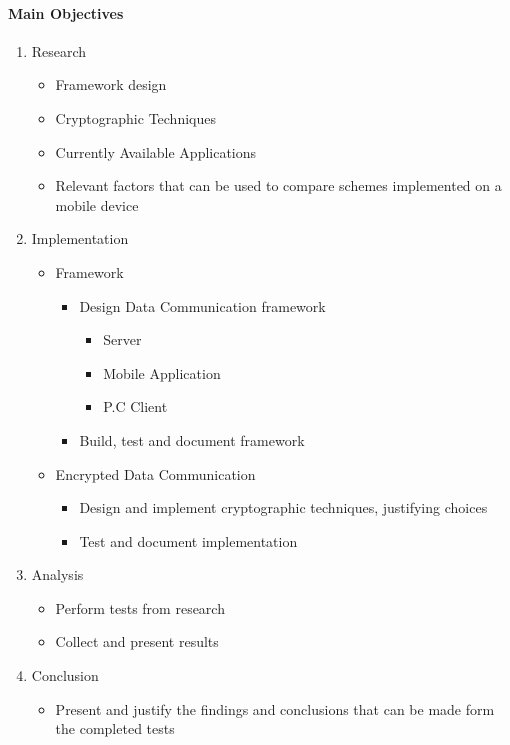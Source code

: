 \documentclass[a4paper,11pt]{article}
\begin{document}
\paragraph{Main Objectives}
\begin{enumerate}
  \item Research
  \begin{itemize}
    \item Framework design
    \item Cryptographic Techniques
    \item Currently Available Applications
    \item Relevant factors that can be used to compare schemes implemented on a mobile device
  \end{itemize}
  \item Implementation
  \begin{itemize}
    \item Framework
    \begin{itemize} 
      \item Design Data Communication framework
      \begin{itemize}
        \item Server
        \item Mobile Application
        \item P.C Client
      \end{itemize}
      \item Build, test and document framework
    \end{itemize}
  \item Encrypted Data Communication
  \begin{itemize}
    \item Design and implement cryptographic techniques, justifying choices
    \item Test and document implementation
  \end{itemize}
  \end{itemize}
  \item Analysis
  \begin{itemize}
    \item Perform tests from research
    \item Collect and present results
  \end{itemize}
  \item Conclusion
  \begin{itemize}
    \item Present and justify the findings and conclusions that can be made form the completed tests

\end{itemize}
\end{enumerate}
\end{document}
